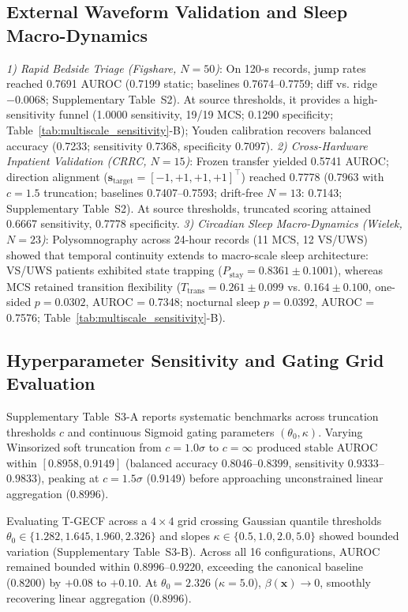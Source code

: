 \documentclass[journal,twoside,web]{ieeecolor}
\begin{document}
\vspace{-3pt}
\subsection{External Waveform Validation and Sleep Macro-Dynamics}
\textit{1) Rapid Bedside Triage (Figshare, $N=50$)}: On 120-s records, jump rates reached 0.7691 AUROC (0.7199 static; baselines 0.7674--0.7759; diff vs. ridge $-0.0068$; Supplementary Table~S2). At source thresholds, it provides a high-sensitivity funnel (1.0000 sensitivity, 19/19 MCS; 0.1290 specificity; Table~\ref{tab:multiscale_sensitivity}-B); Youden calibration recovers balanced accuracy (0.7233; sensitivity 0.7368, specificity 0.7097).
\textit{2) Cross-Hardware Inpatient Validation (CRRC, $N=15$)}: Frozen transfer yielded 0.5741 AUROC; direction alignment ($\mathbf{s}_{\text{target}} = [-1, +1, +1, +1]^\top$) reached 0.7778 (0.7963 with $c=1.5$ truncation; baselines 0.7407--0.7593; drift-free $N=13$: 0.7143; Supplementary Table~S2). At source thresholds, truncated scoring attained 0.6667 sensitivity, 0.7778 specificity.
\textit{3) Circadian Sleep Macro-Dynamics (Wielek, $N=23$)}: Polysomnography across 24-hour records (11 MCS, 12 VS/UWS) showed that temporal continuity extends to macro-scale sleep architecture: VS/UWS patients exhibited state trapping ($P_{\text{stay}} = 0.8361 \pm 0.1001$), whereas MCS retained transition flexibility ($T_{\text{trans}} = 0.261 \pm 0.099$ vs. $0.164 \pm 0.100$, one-sided $p=0.0302$, AUROC = 0.7348; nocturnal sleep $p=0.0392$, AUROC = 0.7576; Table~\ref{tab:multiscale_sensitivity}-B).

\vspace{-3pt}
\subsection{Hyperparameter Sensitivity and Gating Grid Evaluation}
Supplementary Table~S3-A reports systematic benchmarks across truncation thresholds $c$ and continuous Sigmoid gating parameters $(\theta_0, \kappa)$. Varying Winsorized soft truncation from $c = 1.0\sigma$ to $c = \infty$ produced stable AUROC within $[0.8958, 0.9149]$ (balanced accuracy $0.8046$--$0.8399$, sensitivity $0.9333$--$0.9833$), peaking at $c = 1.5\sigma$ ($0.9149$) before approaching unconstrained linear aggregation ($0.8996$).

Evaluating T-GECF across a $4 \times 4$ grid crossing Gaussian quantile thresholds $\theta_0 \in \{1.282, \allowbreak 1.645, \allowbreak 1.960, \allowbreak 2.326\}$ and slopes $\kappa \in \{0.5, \allowbreak 1.0, \allowbreak 2.0, \allowbreak 5.0\}$ showed bounded variation (Supplementary Table~S3-B). Across all 16 configurations, AUROC remained bounded within $0.8996$--$0.9220$, exceeding the canonical baseline (0.8200) by $+0.08$ to $+0.10$. At $\theta_0 = 2.326$ ($\kappa=5.0$), $\beta(\mathbf{x}) \to 0$, smoothly recovering linear aggregation ($0.8996$).
\end{document}
